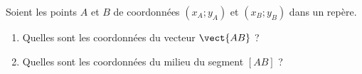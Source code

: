 
\begin{exercice}\label{exosmath-0058}

    Soient les points \( A\) et \( B\) de coordonnées \( (x_A;y_A)\) et \( (x_B;y_B)\) dans un repère.
    \begin{enumerate}
        \item
            Quelles sont les coordonnées du vecteur \( \vect{ AB }\) ?
        \item
            Quelles sont les coordonnées du milieu du segment \( [AB]\) ?
    \end{enumerate}

\end{exercice}
